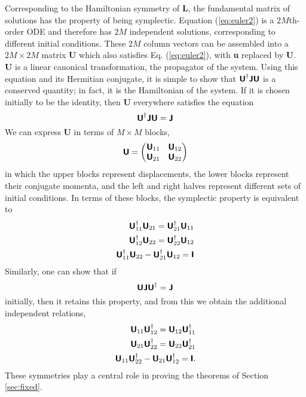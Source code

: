 \documentclass[prb,twocolumn,showpacs,preprintnumbers,amsmath,amssymb]{revtex4}
\renewcommand*{\v}[1]{\hbox{\bfseries #1}}
\renewcommand*{\t}[1]{\hbox{\sffamily\bfseries #1}}
\begin{document}
Corresponding to the Hamiltonian symmetry of \t{L}, the fundamental
matrix of solutions has the property of being symplectic.  Equation
(\ref{eq:euler2}) is a $2M$th-order ODE and therefore has $2M$
independent solutions, corresponding to different initial conditions.
These $2M$ column vectors can be assembled into a $2M \times 2M$ matrix
\t{U} which also satisfies Eq. (\ref{eq:euler2}), with \v{u} replaced by
\t{U}.  \t{U} is a linear canonical transformation, the propagator of
the system.  Using this equation and its Hermitian conjugate, it is
simple to show that $\t{U}^\dagger \t{J} \t{U}$ is a conserved quantity;
in fact, it is the Hamiltonian of the system.  If it is chosen initially
to be the identity, then \t{U} everywhere satisfies the equation
\begin{equation}
\t{U}^\dagger \t{J} \t{U} = \t{J}
\label{eq:symplectic1}
\end{equation}
We can express \t{U} in terms of $M \times M$ blocks,
\begin{equation}
\t{U} = \left( \begin{matrix} \t{U}_{11} & \t{U}_{12} \\
\t{U}_{21} & \t{U}_{22} \end{matrix} \right)
\label{eq:u_blocks}
\end{equation}
in which the upper blocks represent displacements, the lower blocks
represent their conjugate momenta, and the left and right halves
represent different sets of initial conditions.  In terms of these
blocks, the symplectic property is equivalent to
\begin{eqnarray}
\t{U}_{11}^\dagger \t{U}_{21} = \t{U}_{21}^\dagger \t{U}_{11} \nonumber \\
\t{U}_{12}^\dagger \t{U}_{22} = \t{U}_{22}^\dagger \t{U}_{12} \nonumber \\
\t{U}_{11}^\dagger \t{U}_{22} - \t{U}_{21}^\dagger \t{U}_{12} = \t{I}
\label{eq:symplectic2}
\end{eqnarray}
Similarly, one can show that if 
\begin{equation}
\t{U} \t{J} \t{U}^\dagger = \t{J}
\label{eq:symplectic3}
\end{equation}
initially, then it retains this property, and from this we obtain the
additional independent relations,
\begin{eqnarray}
\t{U}_{11} \t{U}_{12}^\dagger = \t{U}_{12} \t{U}_{11}^\dagger \nonumber \\
\t{U}_{21} \t{U}_{22}^\dagger = \t{U}_{22} \t{U}_{21}^\dagger \nonumber \\
\t{U}_{11} \t{U}_{22}^\dagger - \t{U}_{21} \t{U}_{12}^\dagger = \t{I}.
\label{eq:symplectic4}
\end{eqnarray}
These symmetries play a central role in proving the theorems of Section
\ref{sec:fixed}.
\end{document}
